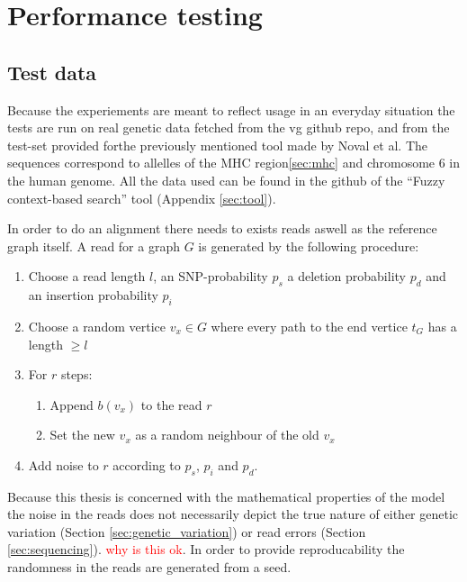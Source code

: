 \documentclass[thesis.tex]{subfiles}
\begin{document}
\chapter{Performance testing}
\section{Test data}
Because the experiements are meant to reflect usage in an everyday situation the tests are run on real genetic data fetched from the vg github repo\cite{vg}, and from the test-set provided forthe previously mentioned tool made by Noval et al. The sequences correspond to allelles of the MHC region\ref{sec:mhc} and chromosome 6 in the human genome. All the data used can be found in the github of the ``Fuzzy context-based search'' tool (Appendix \ref{sec:tool}).\\
\par\noindent
In order to do an alignment there needs to exists reads aswell as the reference graph itself. A read for a graph $G$ is generated by the following procedure:
\begin{enumerate}
  \item Choose a read length $l$, an SNP-probability $p_s$ a deletion probability $p_d$ and an insertion probability $p_i$
  \item Choose a random vertice $v_x \in G$ where every path to the end vertice $t_G$ has a length $\geq l$
  \item For $r$ steps:
  \begin{enumerate}
    \item Append $b(v_x)$ to the read $r$
    \item Set the new $v_x$ as a random neighbour of the old $v_x$
  \end{enumerate}
  \item Add noise to $r$ according to $p_s$, $p_i$ and $p_d$.
\end{enumerate}
Because this thesis is concerned with the mathematical properties of the model the noise in the reads does not necessarily depict the true nature of either genetic variation (Section \ref{sec:genetic_variation}) or read errors (Section \ref{sec:sequencing}). \textcolor{red}{why is this ok}. In order to provide reproducability the randomness in the reads are generated from a seed.
\end{document}
